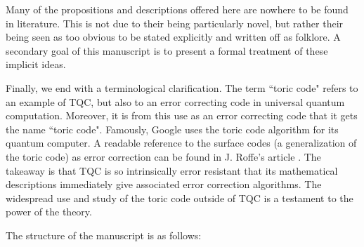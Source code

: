 \documentclass{article}
\theoremstyle{definition}
\numberwithin{figure}{section}
\begin{document}
Many of the propositions and descriptions offered here are nowhere to be found in literature. This is not due to their being particularly novel, but rather their being seen as too obvious to be stated explicitly and written off as folklore. A secondary goal of this manuscript is to present a formal treatment of these implicit ideas.

Finally, we end with a terminological clarification. The term ``toric code" refers to an example of TQC, but also to an error correcting code in universal quantum computation. Moreover, it is from this use as an error correcting code that it gets the name ``toric code". Famously, Google uses the toric code algorithm for its quantum computer. A readable reference to the surface codes (a generalization of the toric code) as error correction can be found in J. Roffe's article \cite{roffe2019quantum}. The takeaway is that TQC is so intrinsically error resistant that its mathematical descriptions immediately give associated error correction algorithms. The widespread use and study of the toric code outside of TQC is a testament to the power of the theory.


The structure of the manuscript is as follows:
\end{document}
